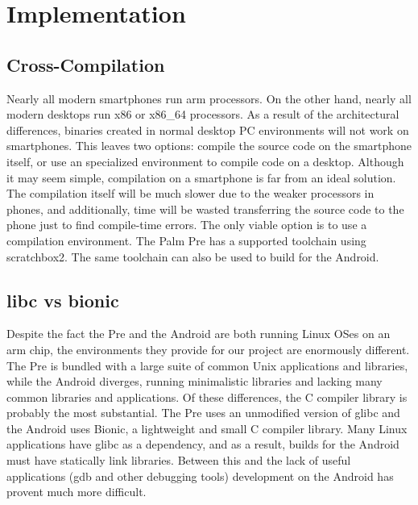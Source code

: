 \section{Implementation}
\subsection{Cross-Compilation}
Nearly all modern smartphones run arm processors.  On the other hand, nearly all modern desktops run x86 or x86\_64 processors.  As a result of the architectural differences, binaries created in normal desktop PC environments will not work on smartphones.  This leaves two options: compile the source code on the smartphone itself, or use an specialized environment to compile code on a desktop.  Although it may seem simple, compilation on a smartphone is far from an ideal solution.  The compilation itself will be much slower due to the weaker processors in phones, and additionally, time will be wasted transferring the source code to the phone just to find compile-time errors.  The only viable option is to use a compilation environment.  The Palm Pre has a supported toolchain using scratchbox2.  The same toolchain can also be used to build for the Android.

\subsection{libc vs bionic}
Despite the fact the Pre and the Android are both running Linux OSes on an arm chip, the environments they provide for our project are enormously different.  The Pre is bundled with a large suite of common Unix applications and libraries, while the Android diverges, running minimalistic libraries and lacking many common libraries and applications.  Of these differences, the C compiler library is probably the most substantial. The Pre uses an unmodified version of glibc and the Android uses Bionic, a lightweight and small C compiler library.  Many Linux applications have glibc as a dependency, and as a result, builds for the Android must have statically link libraries.  Between this and the lack of useful applications (gdb and other debugging tools) development on the Android has provent much more difficult.  
